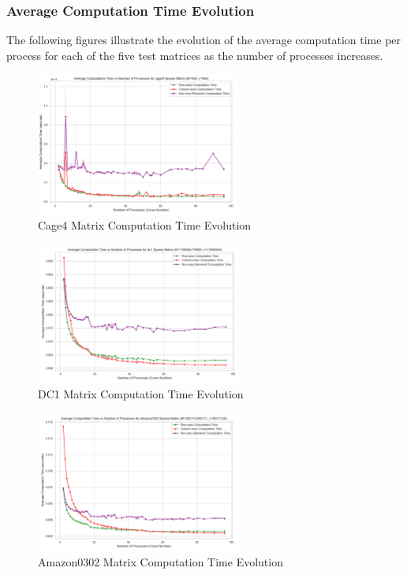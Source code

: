 \documentclass[12pt,oneside]{book} %
\begin{document}
\subsubsection{Average Computation Time Evolution}
The following figures illustrate the evolution of the average computation time
per process for each of the five test matrices as the number of processes
increases.

\begin{figure}[H]
    \centering
    \includegraphics[width=0.6\textwidth]{../results/matrix_dim/cage4_k6_computation_time.png}
    \caption{Cage4 Matrix Computation Time Evolution}\label{fig:cage4-k6-computation-time}
\end{figure}

\begin{figure}[H]
    \centering
    \includegraphics[width=0.6\textwidth]{../results/matrix_dim/dc1_k6_computation_time.png}
    \caption{DC1 Matrix Computation Time Evolution}\label{fig:dc1-k6-computation-time}
\end{figure}

\begin{figure}[H]
    \centering
    \includegraphics[width=0.6\textwidth]{../results/matrix_dim/amazon0302_k6_computation_time.png}
    \caption{Amazon0302 Matrix Computation Time Evolution}\label{fig:amazon0302-k6-computation-time}
\end{figure}
\end{document}
